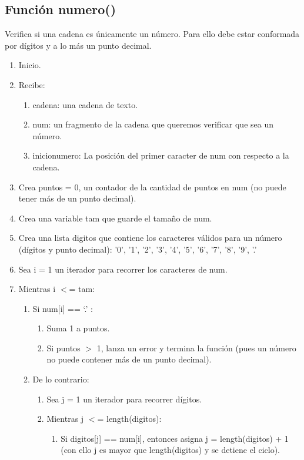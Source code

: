 \documentclass{article}
\begin{document}
\subsection{Función numero()}
\normalsize Verifica si una cadena es únicamente un número. Para ello debe estar conformada por dígitos y a lo más un punto decimal.
\begin{enumerate}
    \item Inicio.
    \item Recibe:
    \begin{enumerate}
        \item cadena: una cadena de texto.
        \item num:  un fragmento de la cadena que queremos verificar que sea un número.
        \item inicionumero: La posición del primer caracter de num  con respecto a la cadena.
    \end{enumerate}
    \item Crea puntos = 0, un contador de la cantidad de puntos en num (no puede tener más de un punto decimal).
    \item Crea una variable tam que guarde el tamaño de num.
    \item Crea una lista digitos que contiene los caracteres válidos para un número (dígitos y punto decimal): '0', '1', '2', '3', '4', '5', '6', '7', '8', '9', '.'
    \item Sea i = 1 un iterador para recorrer los caracteres de  num.
    \item Mientras i $<$= tam:
    \begin{enumerate}
        \item Si num[i] == ‘.’ :
        \begin{enumerate}
            \item Suma 1 a puntos.
            \item Si puntos $>$ 1, lanza un error y termina la función (pues un número no puede contener más de un punto decimal).
        \end{enumerate}
        \item De lo contrario:
        \begin{enumerate}
            \item Sea j = 1 un iterador para recorrer dígitos.
            \item Mientras j $<$= length(digitos):
            \begin{enumerate}
                \item Si digitos[j] == num[i], entonces asigna j = length(digitos) + 1 (con ello j es mayor que length(digitos) y se detiene el ciclo).

\end{enumerate}
\end{enumerate}
\end{enumerate}
\end{enumerate}
\end{document}
